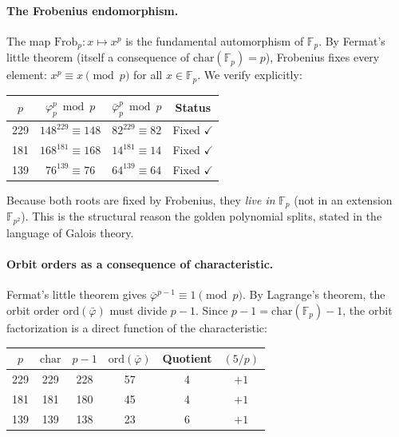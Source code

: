 \paragraph{The Frobenius endomorphism.}
The map $\mathrm{Frob}_p: x \mapsto x^p$ is the fundamental automorphism of $\mathbb{F}_p$. By Fermat's little theorem (itself a consequence of $\mathrm{char}(\mathbb{F}_p) = p$), Frobenius fixes every element: $x^p \equiv x \pmod{p}$ for all $x \in \mathbb{F}_p$. We verify explicitly:
\begin{center}
\begin{tabular}{@{}cccc@{}}
\toprule
$p$ & $\varphi_p^p \bmod p$ & $\bar\varphi_p^p \bmod p$ & Status \\
\midrule
229 & $148^{229} \equiv 148$ & $82^{229} \equiv 82$ & Fixed $\checkmark$ \\
181 & $168^{181} \equiv 168$ & $14^{181} \equiv 14$ & Fixed $\checkmark$ \\
139 & $76^{139} \equiv 76$ & $64^{139} \equiv 64$ & Fixed $\checkmark$ \\
\bottomrule
\end{tabular}
\end{center}
Because both roots are fixed by Frobenius, they \emph{live in} $\mathbb{F}_p$ (not in an extension $\mathbb{F}_{p^2}$). This is the structural reason the golden polynomial splits, stated in the language of Galois theory.

\paragraph{Orbit orders as a consequence of characteristic.}
Fermat's little theorem gives $\bar\varphi^{p-1} \equiv 1 \pmod{p}$. By Lagrange's theorem, the orbit order $\mathrm{ord}(\bar\varphi)$ must divide $p - 1$. Since $p - 1 = \mathrm{char}(\mathbb{F}_p) - 1$, the orbit factorization is a direct function of the characteristic:

\begin{center}
\begin{tabular}{@{}cccccc@{}}
\toprule
$p$ & $\mathrm{char}$ & $p - 1$ & $\mathrm{ord}(\bar\varphi)$ & Quotient & $(5/p)$ \\
\midrule
229 & 229 & 228 & 57 & 4 & $+1$ \\
181 & 181 & 180 & 45 & 4 & $+1$ \\
139 & 139 & 138 & 23 & 6 & $+1$ \\
\bottomrule
\end{tabular}
\end{center}

